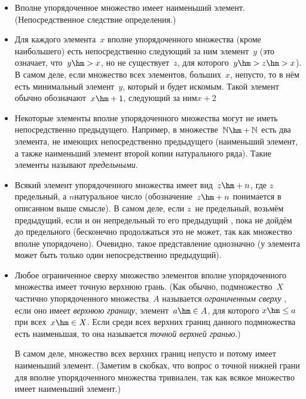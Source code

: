 \begin{itemize}
\item
Вполне упорядоченное множество имеет наименьший элемент.
(Непосредственное следствие определения.)
\item
Для каждого элемента~$x$ вполне упорядоченного множества (кроме
наибольшего) есть непосредственно следующий за ним элемент~$y$
(это означает, что~$y\hm>x$, но не существует~$z$, для
которого~$y\hm>z\hm>x$). В самом деле, если множество всех элементов,
больших~$x$, непусто, то в нём есть минимальный элемент~$y$,
который и будет искомым. Такой элемент обычно обозначают~$x\hm+1$,
следующий за ним\т $x+2$~
\item
Некоторые элементы вполне упорядоченного множества могут не иметь
непосредственно предыдущего. Например, в
множестве~$\mathbb{N}\hm+\mathbb{N}$ есть два элемента, не имеющих
непосредственно предыдущего (наименьший элемент, а также
наименьший элемент второй копии натурального ряда). Такие
элементы называют \emph{предельными}.
\item\label{limit-natural}
Всякий элемент упорядоченного множества имеет вид~$z\hm+n$, где
$z$\т предельный, а $n$\т натуральное число (обозначение~$z\hm+n$
понимается в описанном выше смысле). В самом деле, если $z$~не
предельный, возьмём предыдущий, если и он непредельный\т
то его предыдущий , пока не дойдём до предельного
(бесконечно продолжаться это не может, так как множество вполне
упорядочено). Очевидно, такое представление однозначно
(у элемента может быть только один непосредственно предыдущий).
\item
Любое ограниченное сверху множество элементов вполне упорядоченного
множества имеет точную верхнюю грань.
(Как обычно, подмножество~$X$ частично
упорядоченного множества~$A$ называется \emph{ограниченным сверху}%
,
если оно имеет \emph{верхнюю границу},
 элемент~$a\hm\in A$,
для которого $x\hm\le a$ при всех~$x\hm\in X$. Если среди
всех верхних границ данного подмножества есть наименьшая, то она
называется \emph{точной верхней гранью}.)

В самом деле, множество всех верхних границ непусто и потому
имеет наименьший элемент. (Заметим в скобках, что вопрос о
точной нижней грани для вполне упорядоченного множества
тривиален, так как всякое множество имеет наименьший элемент.)
\end{itemize}

